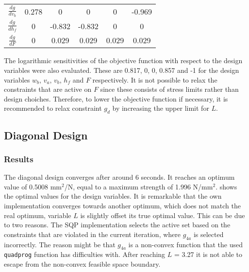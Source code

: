 \begin{table}
\begin{tabular}{c|ccccc}
		\textbf{$\frac{d g}{d v_b}$} & \cellcolor[HTML]{9AFF99}0.278 & 0                              & 0                              & 0                              & \cellcolor[HTML]{9AFF99}-0.969 \\ 
		\textbf{$\frac{dg}{d h_f}$}  & 0                             & \cellcolor[HTML]{9AFF99}-0.832 & \cellcolor[HTML]{9AFF99}-0.832 & 0                              & 0                              \\ 
		\textbf{$\frac{d g}{d F}$}   & 0                             & \cellcolor[HTML]{9AFF99}0.029  & \cellcolor[HTML]{9AFF99}0.029  & \cellcolor[HTML]{9AFF99}0.029  & \cellcolor[HTML]{9AFF99}0.029  \\ 
	\end{tabular}
\end{table}

The logarithmic sensitivities of the objective function with respect to the design variables were also evaluated. 
These are 0.817, 0, 0, 0.857 and -1 for the design variables $w_b$, $v_a$, $v_b$, $h_f$ and $F$ respectively. 
It is not possible to relax the constraints that are active on $F$ since these consists of stress limits rather than design choiches. 
Therefore, to lower the objective function if necessary, it is recommended to relax constraint $g_d$ by increasing the upper limit for $L$. 


\subsection{Diagonal Design}
\subsubsection{Results}
The diagonal design converges after around 6 seconds. It reaches an optimum value of 0.5008 mm$^2$/N, equal to a maximum strength of 1.996 N/mm$^2$.
 shows the optimal values for the design variables.
It is remarkable that the own implementation converges towards another optimum, which does not match the real optimum, variable $L$ is slightly offset its true optimal value. 
This can be due to two reasons. 
The SQP implementation selects the active set based on the constraints that are violated in the current iteration, where $g_{4a}$ is selected incorrectly. 
The reason might be that $g_{4a}$ is a non-convex function that the used \texttt{quadprog} function has difficulties with.
After reaching $L$ = 3.27 it is not able to escape from the non-convex feasible space boundary.



